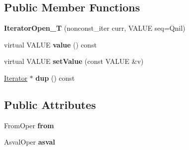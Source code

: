 \subsection*{Public Member Functions}
\begin{DoxyCompactItemize}
\item 
{\bfseries Iterator\+Open\+\_\+T} (nonconst\+\_\+iter curr, V\+A\+L\+UE seq=Qnil)\hypertarget{classswig_1_1IteratorOpen__T_3_01InOutIterator_00_01bool_00_01FromOper_00_01AsvalOper_01_4_aa305036bbae7fa813f13f5a7ce84cbac}{}\label{classswig_1_1IteratorOpen__T_3_01InOutIterator_00_01bool_00_01FromOper_00_01AsvalOper_01_4_aa305036bbae7fa813f13f5a7ce84cbac}

\item 
virtual V\+A\+L\+UE {\bfseries value} () const \hypertarget{classswig_1_1IteratorOpen__T_3_01InOutIterator_00_01bool_00_01FromOper_00_01AsvalOper_01_4_a81b65d4b4c6ce6316aaca00793576790}{}\label{classswig_1_1IteratorOpen__T_3_01InOutIterator_00_01bool_00_01FromOper_00_01AsvalOper_01_4_a81b65d4b4c6ce6316aaca00793576790}

\item 
virtual V\+A\+L\+UE {\bfseries set\+Value} (const V\+A\+L\+UE \&v)\hypertarget{classswig_1_1IteratorOpen__T_3_01InOutIterator_00_01bool_00_01FromOper_00_01AsvalOper_01_4_ac3267658391a3de64f6b131ce958328b}{}\label{classswig_1_1IteratorOpen__T_3_01InOutIterator_00_01bool_00_01FromOper_00_01AsvalOper_01_4_ac3267658391a3de64f6b131ce958328b}

\item 
\hyperlink{structswig_1_1Iterator}{Iterator} $\ast$ {\bfseries dup} () const \hypertarget{classswig_1_1IteratorOpen__T_3_01InOutIterator_00_01bool_00_01FromOper_00_01AsvalOper_01_4_a5d4c38bcd2c8d7857ac1677d3178d83d}{}\label{classswig_1_1IteratorOpen__T_3_01InOutIterator_00_01bool_00_01FromOper_00_01AsvalOper_01_4_a5d4c38bcd2c8d7857ac1677d3178d83d}

\end{DoxyCompactItemize}
\subsection*{Public Attributes}
\begin{DoxyCompactItemize}
\item 
From\+Oper {\bfseries from}\hypertarget{classswig_1_1IteratorOpen__T_3_01InOutIterator_00_01bool_00_01FromOper_00_01AsvalOper_01_4_af6900cf2ce1dab9cf4783d840e8df783}{}\label{classswig_1_1IteratorOpen__T_3_01InOutIterator_00_01bool_00_01FromOper_00_01AsvalOper_01_4_af6900cf2ce1dab9cf4783d840e8df783}

\item 
Asval\+Oper {\bfseries asval}\hypertarget{classswig_1_1IteratorOpen__T_3_01InOutIterator_00_01bool_00_01FromOper_00_01AsvalOper_01_4_a167e85b345d1aeb257d9adf939da0f92}{}\label{classswig_1_1IteratorOpen__T_3_01InOutIterator_00_01bool_00_01FromOper_00_01AsvalOper_01_4_a167e85b345d1aeb257d9adf939da0f92}

\end{DoxyCompactItemize}
